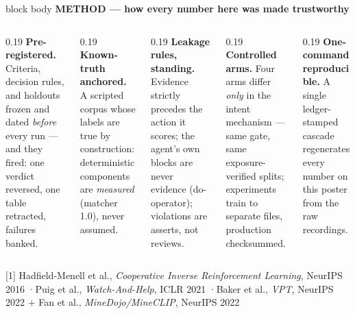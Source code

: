 \documentclass[final]{beamer}
\begin{document}
\begin{frame}[t]
\vspace{1.0em}
\begin{beamercolorbox}[wd=\textwidth,sep=0.9em]{block body}
{\large\bfseries\color{micablue} METHOD --- how every number here was made trustworthy}\\[0.6em]
\begin{columns}[t]
\begin{column}{0.19\textwidth}
\textbf{Pre-registered.} Criteria, decision rules, and holdouts frozen and
dated \emph{before} every run --- and they fired: one verdict reversed, one
table retracted, failures banked.
\end{column}
\begin{column}{0.19\textwidth}
\textbf{Known-truth anchored.} A scripted corpus whose labels are true by
construction: deterministic components are \emph{measured} (matcher 1.0),
never assumed.
\end{column}
\begin{column}{0.19\textwidth}
\textbf{Leakage rules, standing.} Evidence strictly precedes the action it
scores; the agent's own blocks are never evidence (do-operator); violations
are asserts, not reviews.
\end{column}
\begin{column}{0.19\textwidth}
\textbf{Controlled arms.} Four arms differ \emph{only} in the intent
mechanism --- same gate, same exposure-verified splits; experiments train to
separate files, production checksummed.
\end{column}
\begin{column}{0.19\textwidth}
\textbf{One-command reproducible.} A single ledger-stamped cascade
regenerates every number on this poster from the raw recordings.
\end{column}
\end{columns}
\vspace{0.7em}
{\footnotesize\color{micagray}
[1] Hadfield-Menell et al., \emph{Cooperative Inverse Reinforcement Learning},
NeurIPS 2016 \;·\;
[2] Puig et al., \emph{Watch-And-Help}, ICLR 2021 \;·\;
[3] Baker et al., \emph{VPT}, NeurIPS 2022 + Fan et al.,
\emph{MineDojo/MineCLIP}, NeurIPS 2022}
\end{beamercolorbox}

\end{frame}
\end{document}
